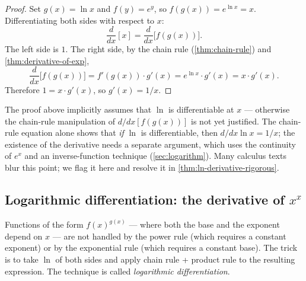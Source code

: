 \begin{proof}
Set \(g(x) = \ln x\) and \(f(y) = e^{y}\), so \(f(g(x)) = e^{\ln x} = x\). Differentiating both sides with respect to \(x\):
\[
\frac{d}{dx}[x] = \frac{d}{dx}\bigl[f(g(x))\bigr].
\]
The left side is \(1\). The right side, by the chain rule (\cref{thm:chain-rule}) and \cref{thm:derivative-of-exp},
\[
\frac{d}{dx}\bigl[f(g(x))\bigr] = f'(g(x)) \cdot g'(x) = e^{\ln x} \cdot g'(x) = x \cdot g'(x).
\]
Therefore \(1 = x \cdot g'(x)\), so \(g'(x) = 1/x\).
\end{proof}

\begin{caution}
The proof above implicitly assumes that \(\ln\) is differentiable at \(x\) --- otherwise the chain-rule manipulation of \(d/dx[f(g(x))]\) is not yet justified. The chain-rule equation alone shows that \emph{if} \(\ln\) is differentiable, then \(d/dx \ln x = 1/x\); the existence of the derivative needs a separate argument, which uses the continuity of \(e^{x}\) and an inverse-function technique (\cref{sec:logarithm}). Many calculus texts blur this point; we flag it here and resolve it in \cref{thm:ln-derivative-rigorous}.
\end{caution}

\subsection{Logarithmic differentiation: the derivative of \texorpdfstring{$x^{x}$}{x\^{}x}}

Functions of the form \(f(x)^{g(x)}\) --- where both the base and the exponent depend on \(x\) --- are not handled by the power rule (which requires a constant exponent) or by the exponential rule (which requires a constant base). The trick is to take \(\ln\) of both sides and apply chain rule + product rule to the resulting expression. The technique is called \emph{logarithmic differentiation}.

